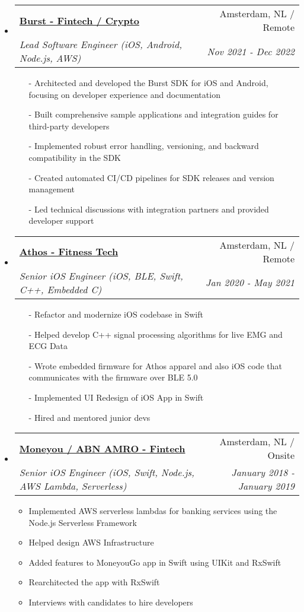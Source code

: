 \documentclass[letterpaper,11pt]{article}
\makeatletter
\newcommand{\resitem}[1]{\item #1 \vspace{-2pt}}
\newcommand{\ressubheading}[4]{
\begin{tabular*}{7.0in}{l@{\extracolsep{\fill}}r}
    \textbf{#1} & #2 \\
    \textit{#3} & \textit{#4} \\
\end{tabular*}\vspace{-6pt}}
\makeatother
\begin{document}
\begin{itemize}
\item
    \ressubheading{\href{https://www.joinburst.com}{Burst - Fintech / Crypto \texttt{}}}{Amsterdam, NL / Remote}{Lead Software Engineer (iOS, Android, Node.js, AWS)}{Nov 2021 - Dec 2022}
    \begin{itemize}
        \item[-]{Architected and developed the Burst SDK for iOS and Android, focusing on developer experience and documentation}
        \item[-]{Built comprehensive sample applications and integration guides for third-party developers}
        \item[-]{Implemented robust error handling, versioning, and backward compatibility in the SDK}
        \item[-]{Created automated CI/CD pipelines for SDK releases and version management}
        \item[-]{Led technical discussions with integration partners and provided developer support}
    \end{itemize}


\item
    \ressubheading{\href{https://www.crunchbase.com/organization/athos}{Athos - Fitness Tech\texttt{}}}{Amsterdam, NL / Remote}{Senior iOS Engineer (iOS, BLE, Swift, C++, Embedded C)}{Jan 2020 - May 2021}
    \begin{itemize}
        \item[-]{Refactor and modernize iOS codebase in Swift}
        \item[-]{Helped develop C++ signal processing algorithms for live EMG and ECG Data}
        \item[-]{Wrote embedded firmware for Athos apparel and also iOS code that communicates with the firmware over BLE 5.0}
        \item[-]{Implemented UI Redesign of iOS App in Swift}
        \item[-]{Hired and mentored junior devs}
    \end{itemize}
    
\item
    \ressubheading{\href{https://www.moneyou.nl/}{Moneyou / ABN AMRO - Fintech }}{Amsterdam, NL / Onsite}{Senior iOS Engineer (iOS, Swift, Node.js, AWS Lambda, Serverless)}{January 2018 - January 2019}
    \begin{itemize}
        \resitem{Implemented AWS serverless lambdas for banking services using the Node.js Serverless Framework}
        \resitem{Helped design AWS Infrastructure}
        \resitem{Added features to MoneyouGo app in Swift using UIKit and RxSwift}
        \resitem{Rearchitected the app with RxSwift}
        \resitem{Interviews with candidates to hire developers}
    \end{itemize}
        

\end{itemize}
\end{document}
